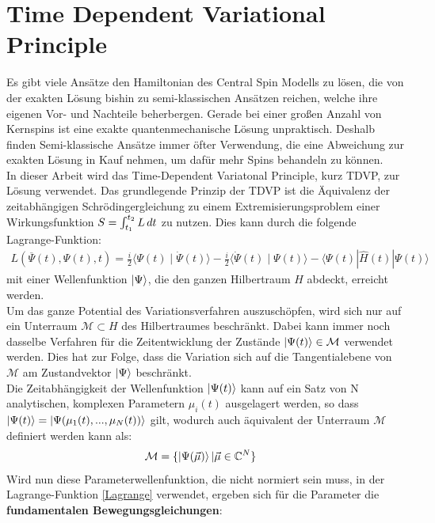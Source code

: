 \chapter{Time Dependent Variational Principle}\label{make}
Es gibt viele Ansätze den Hamiltonian des Central Spin Modells zu lösen, die von der exakten Lösung bishin zu 
semi-klassischen Ansätzen reichen, welche ihre eigenen Vor- und Nachteile beherbergen. Gerade bei einer großen Anzahl 
von Kernspins ist eine exakte quantenmechanische Lösung unpraktisch. Deshalb finden Semi-klassische Ansätze immer öfter Verwendung, 
die eine Abweichung zur exakten Lösung in Kauf nehmen, um dafür mehr Spins behandeln zu können. \\ 
In dieser Arbeit wird das Time-Dependent Variatonal Principle, kurz TDVP, zur Lösung verwendet.
Das grundlegende Prinzip der TDVP ist die Äquivalenz der zeitabhängigen Schrödingergleichung zu einem Extremisierungsproblem einer 
Wirkungsfunktion $S=\int_{t_1}^{t_2}L \thinspace dt$ zu nutzen. Dies kann durch die folgende Lagrange-Funktion:
\begin{align}\label{Lagrange}
    L\left(\overline{\Psi}(t), \Psi(t), t\right)=\frac{i}{2}\langle\Psi(t) \mid \dot{\Psi}(t)\rangle-\frac{i}{2}\langle\dot{\Psi}(t) \mid \Psi(t)\rangle-\langle\Psi(t)|\hat{H}(t)| \Psi(t)\rangle
\end{align}
mit einer Wellenfunktion $\ket{\Psi}$, die den ganzen Hilbertraum $H$ abdeckt, erreicht werden. \\
\noindent Um das ganze Potential des Variationsverfahren auszuschöpfen, wird sich nur auf ein Unterraum $\mathcal{M}\subset H$ des
Hilbertraumes beschränkt. Dabei kann immer noch dasselbe Verfahren für die Zeitentwicklung der Zustände $\ket{\Psi(t)}\in\mathcal{M}$
verwendet werden. Dies hat zur Folge, dass die Variation sich auf die Tangentialebene von $\mathcal{M}$ am Zustandvektor $\ket{\Psi}$
beschränkt.\\
Die Zeitabhängigkeit der Wellenfunktion $\ket{\Psi(t)}$ kann auf ein Satz von N analytischen, komplexen Parametern $\mu_i(t)$ ausgelagert werden, 
so dass $\ket{\Psi(t)} = \ket{\Psi(\mu_1(t),...,\mu_N(t))}$ gilt, wodurch auch äquivalent der Unterraum $\mathcal{M}$ definiert werden kann als:
\begin{align}
    \mathcal{M} &= \{\ket{\Psi(\vec{\mu})}|\vec{\mu}\in \mathbb{C}^N\}
\end{align}
Wird nun diese Parameterwellenfunktion, die nicht normiert sein muss, in der Lagrange-Funktion \autoref{Lagrange} verwendet, ergeben sich 
für die Parameter die \textbf{fundamentalen Bewegungsgleichungen}:
